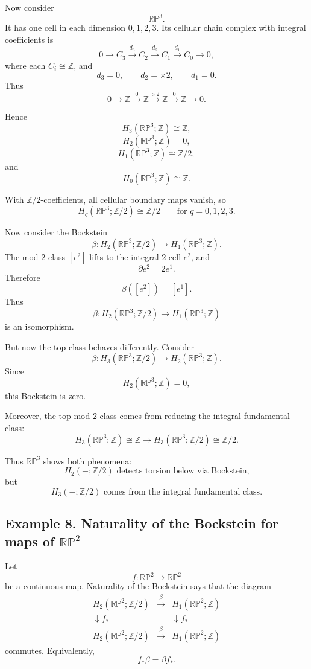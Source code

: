 \documentclass[12pt,a4paper]{article}
\theoremstyle{notespace}
\begin{document}
Now consider
\[
\mathbb{RP}^3.
\]
It has one cell in each dimension \(0,1,2,3\). Its cellular chain complex with integral coefficients is
\[
0
\longrightarrow
C_3
\xrightarrow{d_3}
C_2
\xrightarrow{d_2}
C_1
\xrightarrow{d_1}
C_0
\longrightarrow
0,
\]
where each \(C_i\cong\mathbb Z\), and
\[
d_3=0,
\qquad
d_2=\times 2,
\qquad
d_1=0.
\]
Thus
\[
0
\longrightarrow
\mathbb Z
\xrightarrow{0}
\mathbb Z
\xrightarrow{\times 2}
\mathbb Z
\xrightarrow{0}
\mathbb Z
\longrightarrow
0.
\]

Hence
\[
H_3(\mathbb{RP}^3;\mathbb Z)\cong\mathbb Z,
\]
\[
H_2(\mathbb{RP}^3;\mathbb Z)=0,
\]
\[
H_1(\mathbb{RP}^3;\mathbb Z)\cong\mathbb Z/2,
\]
and
\[
H_0(\mathbb{RP}^3;\mathbb Z)\cong\mathbb Z.
\]

With \(\mathbb Z/2\)-coefficients, all cellular boundary maps vanish, so
\[
H_q(\mathbb{RP}^3;\mathbb Z/2)\cong\mathbb Z/2
\qquad
\text{for }q=0,1,2,3.
\]

Now consider the Bockstein
\[
\beta:H_2(\mathbb{RP}^3;\mathbb Z/2)
\longrightarrow
H_1(\mathbb{RP}^3;\mathbb Z).
\]
The mod \(2\) class \([e^2]\) lifts to the integral \(2\)-cell \(e^2\), and
\[
\partial e^2=2e^1.
\]
Therefore
\[
\beta([e^2])=[e^1].
\]
Thus
\[
\boxed{
	\beta:H_2(\mathbb{RP}^3;\mathbb Z/2)
	\longrightarrow
	H_1(\mathbb{RP}^3;\mathbb Z)
}
\]
is an isomorphism.

But now the top class behaves differently. Consider
\[
\beta:H_3(\mathbb{RP}^3;\mathbb Z/2)
\longrightarrow
H_2(\mathbb{RP}^3;\mathbb Z).
\]
Since
\[
H_2(\mathbb{RP}^3;\mathbb Z)=0,
\]
this Bockstein is zero.

Moreover, the top mod \(2\) class comes from reducing the integral fundamental class:
\[
H_3(\mathbb{RP}^3;\mathbb Z)\cong\mathbb Z
\longrightarrow
H_3(\mathbb{RP}^3;\mathbb Z/2)\cong\mathbb Z/2.
\]

Thus \(\mathbb{RP}^3\) shows both phenomena:
\[
\boxed{
	H_2(-;\mathbb Z/2)\text{ detects torsion below via Bockstein,}
}
\]
but
\[
\boxed{
	H_3(-;\mathbb Z/2)\text{ comes from the integral fundamental class.}
}
\]

\subsection{Example 8. Naturality of the Bockstein for maps of \texorpdfstring{\(\mathbb{RP}^2\)}{RP2}}

Let
\[
f:\mathbb{RP}^2\longrightarrow \mathbb{RP}^2
\]
be a continuous map. Naturality of the Bockstein says that the diagram
\[
\begin{array}{ccc}
	H_2(\mathbb{RP}^2;\mathbb Z/2)
	&
	\xrightarrow{\beta}
	&
	H_1(\mathbb{RP}^2;\mathbb Z)
	\\[1mm]
	\downarrow f_*
	&&
	\downarrow f_*
	\\[1mm]
	H_2(\mathbb{RP}^2;\mathbb Z/2)
	&
	\xrightarrow{\beta}
	&
	H_1(\mathbb{RP}^2;\mathbb Z)
\end{array}
\]
commutes. Equivalently,
\[
f_*\beta=\beta f_*.
\]
\end{document}
